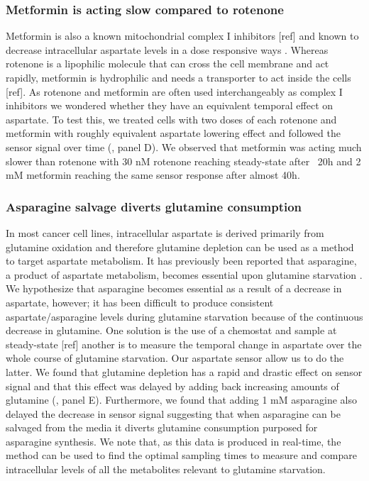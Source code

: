 \documentclass[9pt,lineno]{elife}
\begin{document}
\subsubsection{Metformin is acting slow compared to rotenone}
Metformin is also a known mitochondrial complex I inhibitors [ref] and known to decrease intracellular aspartate levels in a dose responsive ways \citep{Gui2016-ca}.
Whereas rotenone is a lipophilic molecule that can cross the cell membrane and act rapidly, metformin is hydrophilic and needs a transporter to act inside the cells [ref].
As rotenone and metformin are often used interchangeably as complex I inhibitors we wondered whether they have an equivalent temporal effect on aspartate.
To test this, we treated cells with two doses of each rotenone and metformin with roughly equivalent aspartate lowering effect and followed the sensor signal over time (, panel D).
We observed that metformin was acting much slower than rotenone with 30 nM rotenone reaching steady-state after ~20h and 2 mM metformin reaching the same sensor response after almost 40h.


\subsubsection{Asparagine salvage diverts glutamine consumption}
In most cancer cell lines, intracellular aspartate is derived primarily from glutamine oxidation and therefore glutamine depletion can be used as a method to target aspartate metabolism.
It has previously been reported that asparagine, a product of aspartate metabolism, becomes essential upon glutamine starvation \citep{Pavlova2018-nl}.
We hypothesize that asparagine becomes essential as a result of a decrease in aspartate, however; it has been difficult to produce consistent aspartate/asparagine levels during glutamine starvation because of the continuous decrease in glutamine.
One solution is the use of a chemostat and sample at steady-state [ref] another is to measure the temporal change in aspartate over the whole course of glutamine starvation.
Our aspartate sensor allow us to do the latter.
We found that glutamine depletion has a rapid and drastic effect on sensor signal and that this effect was delayed by adding back increasing amounts of glutamine (, panel E).
Furthermore, we found that adding 1 mM asparagine also delayed the decrease in sensor signal suggesting that when asparagine can be salvaged from the media it diverts glutamine consumption purposed for asparagine synthesis.
We note that, as this data is produced in real-time, the method can be used to find the optimal sampling times to measure and compare intracellular levels of all the metabolites relevant to glutamine starvation.
\end{document}
